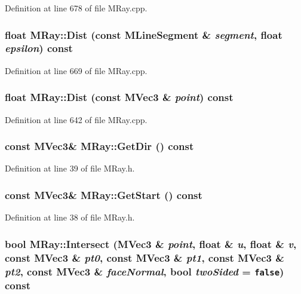 Definition at line 678 of file MRay.cpp.\hypertarget{class_m_ray_1b6c914026833000ea9760f177a2f890}{
\subsubsection[{Dist}]{\setlength{\rightskip}{0pt plus 5cm}float MRay::Dist (const {\bf MLineSegment} \& {\em segment}, \/  float {\em epsilon}) const}}
\label{class_m_ray_1b6c914026833000ea9760f177a2f890}




Definition at line 669 of file MRay.cpp.\hypertarget{class_m_ray_258330bce7cfc69daff8f337e3a92215}{
\subsubsection[{Dist}]{\setlength{\rightskip}{0pt plus 5cm}float MRay::Dist (const {\bf MVec3} \& {\em point}) const}}
\label{class_m_ray_258330bce7cfc69daff8f337e3a92215}




Definition at line 642 of file MRay.cpp.\hypertarget{class_m_ray_cd7ab740f3c8ff43dd79f95ed9a969b6}{
\subsubsection[{GetDir}]{\setlength{\rightskip}{0pt plus 5cm}const {\bf MVec3}\& MRay::GetDir () const}}
\label{class_m_ray_cd7ab740f3c8ff43dd79f95ed9a969b6}




Definition at line 39 of file MRay.h.\hypertarget{class_m_ray_50cd4ec247b5df4a4a336478a3a19c91}{
\subsubsection[{GetStart}]{\setlength{\rightskip}{0pt plus 5cm}const {\bf MVec3}\& MRay::GetStart () const}}
\label{class_m_ray_50cd4ec247b5df4a4a336478a3a19c91}




Definition at line 38 of file MRay.h.\hypertarget{class_m_ray_773aeaf4f6aada0dfdc59da124e483ae}{
\subsubsection[{Intersect}]{\setlength{\rightskip}{0pt plus 5cm}bool MRay::Intersect ({\bf MVec3} \& {\em point}, \/  float \& {\em u}, \/  float \& {\em v}, \/  const {\bf MVec3} \& {\em pt0}, \/  const {\bf MVec3} \& {\em pt1}, \/  const {\bf MVec3} \& {\em pt2}, \/  const {\bf MVec3} \& {\em faceNormal}, \/  bool {\em twoSided} = {\tt false}) const}}
\label{class_m_ray_773aeaf4f6aada0dfdc59da124e483ae}




